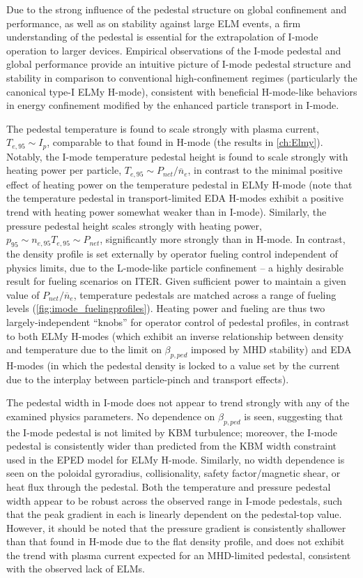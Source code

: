 Due to the strong influence of the pedestal structure on global confinement and performance, as well as on stability against large ELM events, a firm understanding of the pedestal is essential for the extrapolation of I-mode operation to larger devices.  Empirical observations of the I-mode pedestal and global performance provide an intuitive picture of I-mode pedestal structure and stability in comparison to conventional high-confinement regimes (particularly the canonical type-I ELMy H-mode), consistent with beneficial H-mode-like behaviors in energy confinement modified by the enhanced particle transport in I-mode.

The pedestal temperature is found to scale strongly with plasma current, $T_{e,95} \sim I_p$, comparable to that found in H-mode (\cf the results in \cref{ch:Elmy}).  Notably, the I-mode temperature pedestal height is found to scale strongly with heating power per particle, $T_{e,95} \sim P_{net}/\overline{n}_e$, in contrast to the minimal positive effect of heating power on the temperature pedestal in ELMy H-mode (note that the temperature pedestal in transport-limited EDA H-modes exhibit a positive trend with heating power somewhat weaker than in I-mode).    Similarly, the pressure pedestal height scales strongly with heating power, $p_{95} \sim n_{e,95} T_{e,95} \sim P_{net}$, significantly more strongly than in H-mode.  In contrast, the density profile is set externally by operator fueling control independent of physics limits, due to the L-mode-like particle confinement -- a highly desirable result for fueling scenarios on ITER.  Given sufficient power to maintain a given value of $P_{net}/\overline{n}_e$, temperature pedestals are matched across a range of fueling levels (\cref{fig:imode_fuelingprofiles}).  Heating power and fueling are thus two largely-independent ``knobs'' for operator control of pedestal profiles, in contrast to both ELMy H-modes (which exhibit an inverse relationship between density and temperature due to the limit on $\beta_{p,ped}$ imposed by MHD stability) and EDA H-modes (in which the pedestal density is locked to a value set by the current due to the interplay between particle-pinch and transport effects).

The pedestal width in I-mode does not appear to trend strongly with any of the examined physics parameters.  No dependence on $\beta_{p,ped}$ is seen, suggesting that the I-mode pedestal is not limited by KBM turbulence; moreover, the I-mode pedestal is consistently wider than predicted from the KBM width constraint used in the EPED model for ELMy H-mode.  Similarly, no width dependence is seen on the poloidal gyroradius, collisionality, safety factor/magnetic shear, or heat flux through the pedestal.  Both the temperature and pressure pedestal width appear to be robust across the observed range in I-mode pedestals, such that the peak gradient in each is linearly dependent on the pedestal-top value.  However, it should be noted that the pressure gradient is consistently shallower than that found in H-mode due to the flat density profile, and does not exhibit the trend with plasma current expected for an MHD-limited pedestal, consistent with the observed lack of ELMs.

